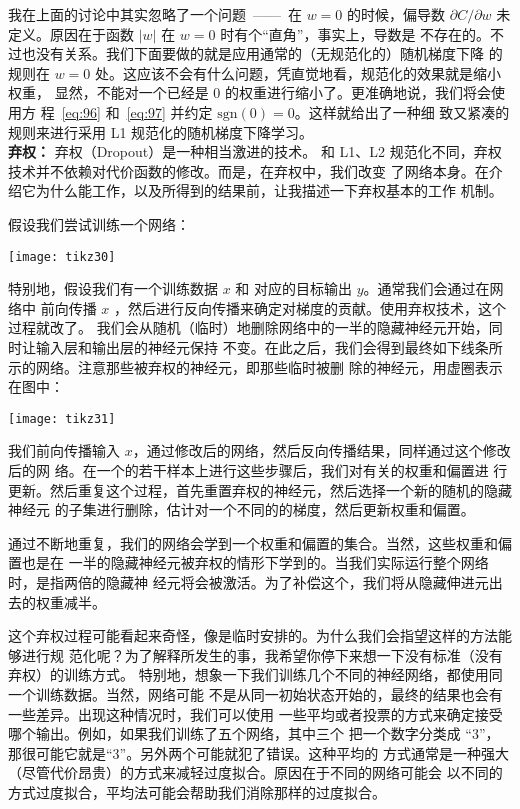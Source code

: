 我在上面的讨论中其实忽略了一个问题~——~在 $w=0$ 的时候，偏导数 $\partial
C/\partial w$ 未定义。原因在于函数 $|w|$ 在 $w=0$ 时有个“直角”，事实上，导数是
不存在的。不过也没有关系。我们下面要做的就是应用通常的（无规范化的）随机梯度下降
的规则在 $w=0$ 处。这应该不会有什么问题，凭直觉地看，规范化的效果就是缩小权重，
显然，不能对一个已经是 $0$ 的权重进行缩小了。更准确地说，我们将会使用方
程~\eqref{eq:96} 和~\eqref{eq:97} 并约定 $\mbox{sgn}(0) = 0$。这样就给出了一种细
致又紧凑的规则来进行采用 L1 规范化的随机梯度下降学习。\\

\textbf{弃权：} 弃权（Dropout）是一种相当激进的技术。
和 L1、L2 规范化不同，弃权技术并不依赖对代价函数的修改。而是，在弃权中，我们改变
了网络本身。在介绍它为什么能工作，以及所得到的结果前，让我描述一下弃权基本的工作
机制。

假设我们尝试训练一个网络：
\begin{center}
  \texttt{[image: tikz30]}
\end{center}

特别地，假设我们有一个训练数据 $x$ 和 对应的目标输出 $y$。通常我们会通过在网络中
前向传播 $x$ ，然后进行反向传播来确定对梯度的贡献。使用弃权技术，这个过程就改了。
我们会从随机（临时）地删除网络中的一半的隐藏神经元开始，同时让输入层和输出层的神经元保持
不变。在此之后，我们会得到最终如下线条所示的网络。注意那些被弃权的神经元，即那些临时被删
除的神经元，用虚圈表示在图中：
\begin{center}
  \texttt{[image: tikz31]}
\end{center}

我们前向传播输入 $x$，通过修改后的网络，然后反向传播结果，同样通过这个修改后的网
络。在一个的若干样本上进行这些步骤后，我们对有关的权重和偏置进
行更新。然后重复这个过程，首先重置弃权的神经元，然后选择一个新的随机的隐藏神经元
的子集进行删除，估计对一个不同的\minibatch{}的梯度，然后更新权重和偏置。

通过不断地重复，我们的网络会学到一个权重和偏置的集合。当然，这些权重和偏置也是在
一半的隐藏神经元被弃权的情形下学到的。当我们实际运行整个网络时，是指两倍的隐藏神
经元将会被激活。为了补偿这个，我们将从隐藏伸进元出去的权重减半。

这个弃权过程可能看起来奇怪，像是临时安排的。为什么我们会指望这样的方法能够进行规
范化呢？为了解释所发生的事，我希望你停下来想一下没有标准（没有弃权）的训练方式。
特别地，想象一下我们训练几个不同的神经网络，都使用同一个训练数据。当然，网络可能
不是从同一初始状态开始的，最终的结果也会有一些差异。出现这种情况时，我们可以使用
一些平均或者投票的方式来确定接受哪个输出。例如，如果我们训练了五个网络，其中三个
把一个数字分类成 “3”，那很可能它就是“3”。另外两个可能就犯了错误。这种平均的
方式通常是一种强大（尽管代价昂贵）的方式来减轻过度拟合。原因在于不同的网络可能会
以不同的方式过度拟合，平均法可能会帮助我们消除那样的过度拟合。

